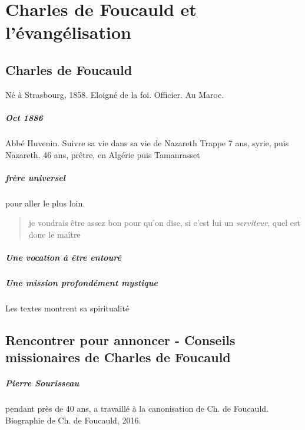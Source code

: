 \chapter{Charles de Foucauld et l'évangélisation}


\section{Charles de Foucauld}
Né à Strasbourg, 1858. 
Eloigné de la foi. Officier. Au Maroc.

\paragraph{Oct 1886} Abbé Huvenin. 
Suivre sa vie dans sa vie de Nazareth
Trappe 7 ans, syrie, puis Nazareth.
46 ans, prêtre, en Algérie puis Tamanrasset

\paragraph{frère universel} pour aller le plus loin. 
\begin{quote}
    je voudrais être assez bon pour qu'on dise, si c'est lui un \textit{serviteur}, quel est donc le maître
\end{quote}

\paragraph{Une vocation à être entouré}

\paragraph{Une mission profondément mystique} Les textes montrent sa spiritualité

\section{Rencontrer pour annoncer - Conseils missionaires de Charles de Foucauld}



\paragraph{Pierre Sourisseau} pendant près de 40 ans, a travaillé à la canonisation de Ch. de Foucauld. Biographie de Ch. de Foucauld, 2016. 

